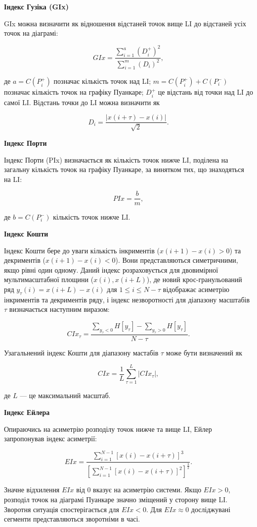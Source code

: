 \documentclass[
  letterpaper,
]{report}
\begin{document}
\textbf{Індекс Гузіка (GIx)}

GIx можна визначити як відношення відстаней точок вище LI до відстаней
усіх точок на діаграмі:

\[ 
GIx = \frac{\sum_{i=1}^{a} \left( D_{i}^{+} \right)^{2}}{\sum_{i=1}^{m} \left( D_{i} \right)^{2} }, 
\]

де \(a = C(P_{i}^{+})\) позначає кількість точок над LI;
\(m = C(P_{i}^{+}) + C(P_{i}^{-})\) позначає кількість точок на графіку
Пуанкаре; \(D_{i}^{+}\) це відстань від точки над LI до самої LI.
Відстань точки до LI можна визначити як

\[ 
D_{i} = \frac{|x(i+\tau) - x(i)|}{\sqrt{2}}. 
\]

\textbf{Індекс Порти}

Індекс Порти (PIx) визначається як кількість точок нижче LI, поділена на
загальну кількість точок на графіку Пуанкаре, за винятком тих, що
знаходяться на LI:

\[ 
PIx = \frac{b}{m}, 
\]

де \(b = C(P_{i}^{-})\) кількість точок нижче LI.

\textbf{Індекс Кошти}

Індекс Кошти бере до уваги кількість інкриментів (\(x(i+1)-x(i) > 0\))
та декриментів (\(x(i+1)-x(i) < 0\)). Вони представляються симетричними,
якщо рівні один одному. Даний індекс розраховується для двовимірної
мультимасштабної площини (\(x(i), x(i+L)\)), де новий крос-гранульований
ряд \(y_{\tau}(i) = x(i+L)-x(i)\) для \(1 \leq i \leq N-\tau\)
відображає асиметрію інкриментів та декриментів ряду, і індекс
незворотності для діапазону масштабів \(\tau\) визначається наступним
виразом:

\[ 
CIx_{\tau} = \frac{\sum_{y_{\tau}<0} H[y_{\tau}] - \sum_{y_{\tau}>0} H[y_{\tau}]}{N-\tau}. 
\]

Узагальнений індекс Кошти для діапазону мастабів \(\tau\) може бути
визначений як

\[ 
CIx = \frac{1}{L} \sum_{\tau=1}^{L} |CIx_{\tau}|, 
\]

де \(L\) --- це максимальний масштаб.

\textbf{Індекс Ейлера}

Опираючись на асиметрію розподілу точок нижче та вище LI, Ейлер
запропонував індекс асиметрії:

\[ 
EIx = \frac{\sum_{i=1}^{N-1} \left[ x(i)-x(i+\tau) \right]^{3}}{\left[ \sum_{i=1}^{N-1} \left[ x(i)-x(i+\tau) \right]^{2} \right]^{\frac{3}{2}}}. 
\]

Значне відхилення \(EIx\) від 0 вказує на асиметрію системи. Якщо
\(EIx>0\), розподіл точок на діаграмі Пуанкаре значно зміщений у сторону
вище LI. Зворотня ситуація спостерігається для \(EIx<0\). Для
\(EIx \approx 0\) досліджувані сегменти представляються зворотніми в
часі.
\end{document}

